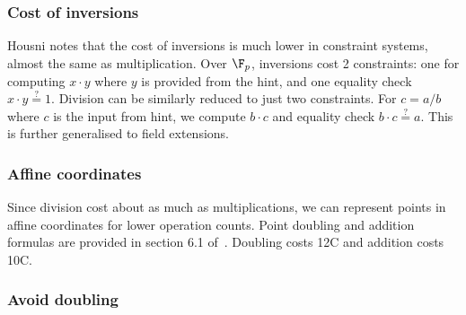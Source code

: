 \subsubsection{Cost of inversions}

Housni notes that the cost of inversions is much lower in constraint systems, almost the same as multiplication. Over $\F_p$, inversions cost 2 constraints: one for computing $x \cdot y$ where $y$ is provided from the hint, and one equality check $x \cdot y \stackrel{?}{=} 1$. Division can be similarly reduced to just two constraints. For $c = a/b$ where $c$ is the input from hint, we compute $b \cdot c$ and equality check $b \cdot c \stackrel{?}{=} a$. This is further generalised to field extensions.



\subsubsection{Affine coordinates}

Since division cost about as much as multiplications, we can represent points in affine coordinates for lower operation counts. Point doubling and addition formulas are provided in section 6.1 of~\cite{ACNS:ElHousni23}. Doubling costs 12C and addition costs 10C.

\subsubsection{Avoid doubling}

